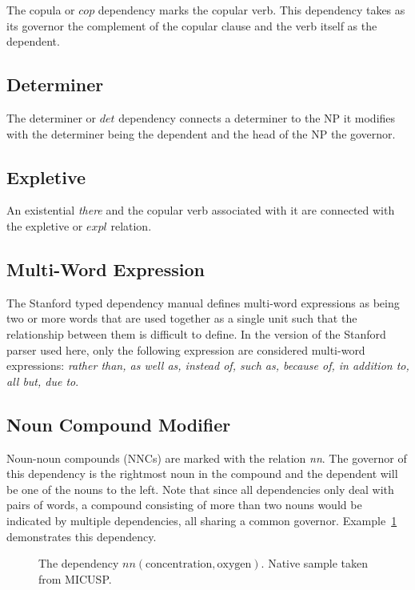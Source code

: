 \documentclass[main.tex]{subfiles}
\begin{document}
The copula or $cop$ dependency marks the copular verb. This dependency takes as its governor the complement of the copular clause and the verb itself as the dependent. 

\subsection{Determiner}

The determiner or $det$ dependency connects a determiner to the NP it modifies with the determiner being the dependent and the head of the NP the governor.

\subsection{Expletive}

An existential \textit{there} and the copular verb associated with it are connected with the expletive or $expl$ relation.

\subsection{Multi-Word Expression}

The Stanford typed dependency manual \citep{typed-deps-manual} defines multi-word expressions as being two or more words that are used together as a single unit such that the relationship between them is difficult to define. In the version of the Stanford parser used here, only the following expression are considered multi-word expressions: \textit{rather than, as well as, instead of, such as, because of, in addition to, all but, due to}.

\subsection{Noun Compound Modifier}

Noun-noun compounds (NNCs) are marked with the relation \textit{nn}. The governor of this dependency is the rightmost noun in the compound and the dependent will be one of the nouns to the left. Note that since all dependencies only deal with pairs of words, a compound consisting of more than two nouns would be indicated by multiple dependencies, all sharing a common governor. Example~\ref{fig:nn-deps} demonstrates this dependency. 

\begin{figure}[htbp]
\caption{The dependency $nn(\text{concentration}, \text{oxygen})$. Native sample taken from MICUSP.}
\centering
{}
\label{fig:nn-deps}
\end{figure}
\end{document}
